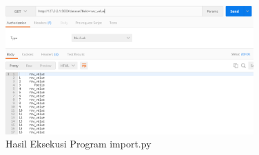 \begin{enumerate}
\begin{figure}[!htbp]
	\centerline{\includegraphics[width=0.85\textwidth]{figures/8/hasil_import.png}}
	\caption{Hasil Eksekusi Program import.py}
	\label{fig:hasil_import}
\end{figure}
\end{enumerate}


